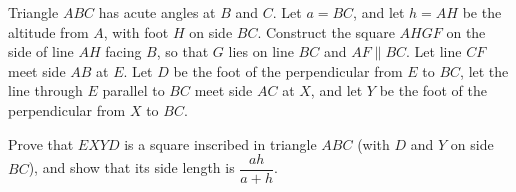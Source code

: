 Triangle $ABC$ has acute angles at $B$ and $C$. Let $a=BC$, and let $h=AH$ be the altitude from $A$, with foot $H$ on side $BC$. Construct the square $AHGF$ on the side of line $AH$ facing $B$, so that $G$ lies on line $BC$ and $AF\parallel BC$. Let line $CF$ meet side $AB$ at $E$. Let $D$ be the foot of the perpendicular from $E$ to $BC$, let the line through $E$ parallel to $BC$ meet side $AC$ at $X$, and let $Y$ be the foot of the perpendicular from $X$ to $BC$.

Prove that $EXYD$ is a square inscribed in triangle $ABC$ (with $D$ and $Y$ on side $BC$), and show that its side length is $\dfrac{ah}{a+h}$.
